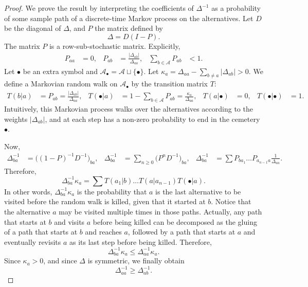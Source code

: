 \documentclass{article}
\newcommand{\cA}{\mathcal A}
\begin{document}
\begin{proof}
    We prove the result by interpreting the coefficients of $\Delta^{-1}$ as a probability
    of some sample path of a discrete-time Markov process on the alternatives.
    Let $D$ be the diagonal of $\Delta$, and $P$ the matrix defined by
    \begin{equation}
        \Delta = D(I - P).
    \end{equation}
    The matrix $P$ is a row-sub-stochastic matrix.
    Explicitly,
    \begin{align}
        P_{aa} &= 0, & P_{ab} &= \frac{|\Delta_{ab}|}{\Delta_{aa}}, & \sum_{b \in \cA} P_{ab} &< 1.
    \end{align}
    Let $\bullet$ be an extra symbol and $\cA_\bullet = \cA \sqcup \{\bullet\}$. Let $\kappa_a = \Delta_{aa} - \sum_{b \ne a} |\Delta_{ab}| > 0$.
    We define a Markovian random walk on $\cA_\bullet$ by the transition matrix $T$:
    \begin{align}
        T(b|a) &= P_{ab} = \frac{|\Delta_{ab}|}{\Delta_{aa}}, & T(\bullet|a) &= 1 - \sum_{b \in \cA} P_{ab} = \frac{\kappa_a}{\Delta_{aa}}, & T(a|\bullet) &= 0, & T(\bullet|\bullet) &= 1.
    \end{align}
    Intuitively, this Markovian process walks over the alternatives according to the weights $|\Delta_{ab}|$, and at each step has a non-zero probability to end in the cemetery $\bullet$.

    Now,
    \begin{align}
        \Delta^{-1}_{ba} 
        &= \big((1 - P)^{-1} D^{-1}\big)_{ba}, & \Delta^{-1}_{ba} &= \sum_{n \ge 0} \big(P^n D^{-1}\big)_{ba}, & \Delta^{-1}_{ba} &= \sum P_{b a_1} \dots P_{a_{n-1}a} \frac{1}{\Delta_{aa}}.
    \end{align}
    Therefore,
    \begin{equation}
        \Delta^{-1}_{ba}\kappa_a = \sum T(a_1|b) \dots T(a|a_{n-1}) T(\bullet|a).
    \end{equation}
    In other words, $\Delta^{-1}_{ba}\kappa_a$ is the probability that $a$ is the last alternative to be visited before the random walk is killed, given that it started at $b$. Notice that the alternative $a$ may be visited multiple times in those paths. Actually, any path that starts at $b$ and visits $a$ before being killed can be decomposed as the gluing of a path that starts at $b$ and reaches $a$, followed by a path that starts at $a$ and eventually revisits $a$ as its last step before being killed. Therefore,
    \begin{equation}
        \Delta^{-1}_{ba}\kappa_a \le \Delta^{-1}_{aa} \kappa_a.
    \end{equation}
    Since $\kappa_a > 0$, and since $\Delta$ is symmetric, we finally obtain
    \begin{equation}
        \Delta^{-1}_{aa} \ge \Delta^{-1}_{ab}.
    \end{equation}    
\end{proof}
\end{document}
